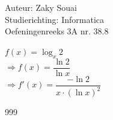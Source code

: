 \documentclass[a4paper]{article}
\begin{document}
  
\noindent \large Auteur: Zaky Souai \\
\noindent \large Studierichting:  Informatica\\
\noindent \large Oefeningenreeks 3A nr. 38.8\\

\bigskip

\normalsize

$f(x) = \log_x 2$ \\

$\Rightarrow f(x) = \dfrac{\ln 2}{\ln x} $ \\

$\Rightarrow f'(x) = \dfrac{-\ln 2}{x \cdot (\ln x)^2}$ \\



\begin{thebibliography}{999}
\end{thebibliography}
\end{document}
